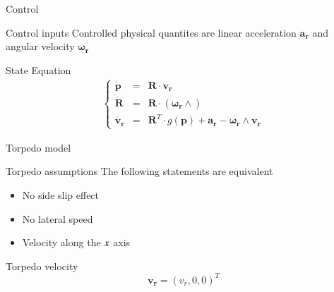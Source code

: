 \documentclass[10pt, xcolor={usenames, dvipsnames}]{beamer}
\begin{document}
        \begin{frame}{Control}
            \centering
            \begin{minipage}{0.7\textwidth}
                \begin{block}{Control inputs}
                    \centering
                    Controlled physical quantites are linear acceleration $\mathbf{a_r}$ and angular velocity $\mathbf{\omega_r}$
                \end{block}
                \begin{block}{State Equation}
                    \begin{eqnarray}
                        \left\{
                            \begin{array}{rcl}
                                \dot{\mathbf{p}} & = & \mathbf{R} \cdot \mathbf{v_r} \\
                                \dot{\mathbf{R}} & = & \mathbf{R} \cdot (\mathbf{\omega_r} \wedge) \\
                                \dot{\mathbf{v_r}} & = & \mathbf{R}^T \cdot g(\mathbf{p}) + \mathbf{a_r} - \mathbf{\omega_r} \wedge \mathbf{v_r}
                            \end{array}
                        \right.
                    \end{eqnarray}
                \end{block}
            \end{minipage}
        \end{frame}


        \begin{frame}{Torpedo model}
            \centering
            \begin{minipage}{0.7\textwidth}
                \begin{block}{Torpedo assumptions}
                    The following statements are equivalent
                    \begin{itemize}
                        \item No side slip effect \\
                        \item No lateral speed
                        \item Velocity along the $\mathnormal{x}$ axis \\
                    \end{itemize}
                \end{block}
                \begin{block}{Torpedo velocity}
                    \begin{equation}
                        \mathbf{v_r} = (v_r, 0, 0)^T
                    \end{equation}
                \end{block}
            \end{minipage}
        \end{frame}
\end{document}

